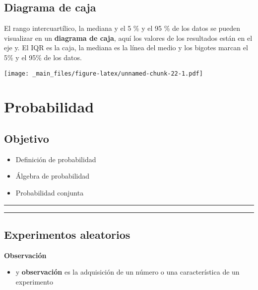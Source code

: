 \documentclass[
]{book}
\providecommand{\tightlist}{%
  \setlength{\itemsep}{0pt}\setlength{\parskip}{0pt}}
\begin{document}
\hypertarget{diagrama-de-caja}{%
\section{Diagrama de caja}\label{diagrama-de-caja}}

El rango intercuartílico, la mediana y el 5 \% y el 95 \% de los datos se pueden visualizar en un \textbf{diagrama de caja}, aquí los valores de los resultados están en el eje y. El IQR es la caja, la mediana es la línea del medio y los bigotes marcan el 5\% y el 95\% de los datos.

\texttt{[image: \_main\_files/figure-latex/unnamed-chunk-22-1.pdf]}

\hypertarget{probabilidad}{%
\chapter{Probabilidad}\label{probabilidad}}

\hypertarget{objetivo-2}{%
\section{Objetivo}\label{objetivo-2}}

\begin{itemize}
\tightlist
\item
  Definición de probabilidad
\item
  Álgebra de probabilidad
\item
  Probabilidad conjunta
\end{itemize}

\begin{center}\rule{0.5\linewidth}{0.5pt}\end{center}

\begin{center}\rule{0.5\linewidth}{0.5pt}\end{center}

\hypertarget{experimentos-aleatorios-1}{%
\section{Experimentos aleatorios}\label{experimentos-aleatorios-1}}

\textbf{Observación}

\begin{itemize}
\tightlist
\item
  y \textbf{observación} es la adquisición de un número o una característica de un experimento
\end{itemize}
\end{document}
